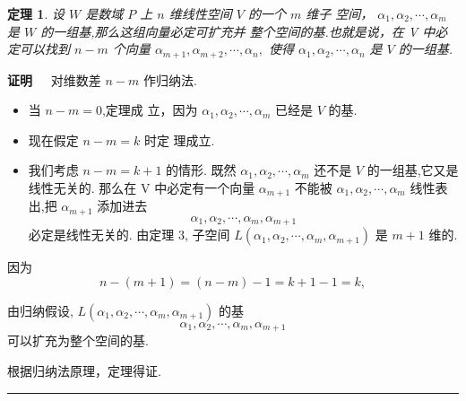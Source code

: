 \documentclass[13pt]{beamer}
\newtheorem{thm}{定理}
\def\qed{\nopagebreak\hfill{\rule{4pt}{7pt}}\medbreak}
\def\pf{{\bf 证明~~ }}
\begin{document}
\begin{frame}
\begin{thm}
设 $W$ 是数域 $P$ 上 $n$ 维线性空间 $V$ 的一个 $m$ 维子 空间， ${\alpha}_{1}, {\alpha}_{2}, \cdots, {\alpha}_{m}$ 是 $W$ 的一组基,那么这组向量必定可扩充并
整个空间的基.也就是说，在 V 中必定可以找到 $n-m$ 个向量 ${\alpha}_{m+1}, {\alpha}_{m+2}, \cdots, {\alpha}_{n},$ 使得 ${\alpha}_{1}, {\alpha}_{2}, \cdots, {\alpha}_{n}$ 是 $V$ 的一组基.
\end{thm}
\pf 对维数差 $n-m$ 作归纳法.
\begin{itemize}
\item 当 $n-m=0$,定理成
立，因为 ${\alpha}_{1}, {\alpha}_{2}, \cdots, {\alpha}_{m}$ 已经是 $V$ 的基.

\item 现在假定 $n-m=k$ 时定
理成立.
\item 我们考虑 $n-m=k+1$ 的情形.
既然 ${\alpha}_{1}, {\alpha}_{2}, \cdots, {\alpha}_{m}$ 还不是 $V$ 的一组基,它又是线性无关的.
那么在 V 中必定有一个向量 ${\alpha}_{m+1}$ 不能被 ${\alpha}_{1}, {\alpha}_{2}, \cdots, {\alpha}_{m}$ 线性表
出,把 ${\alpha}_{m+1}$ 添加进去 $${\alpha}_{1}, {\alpha}_{2}, \cdots, {\alpha}_{m}, {\alpha}_{m+1}$$ 必定是线性无关的.
由定理 3, 子空间 $L\left({\alpha}_{1}, {\alpha}_{2}, \cdots, {\alpha}_{m}, {\alpha}_{m+1}\right)$ 是 $m+1$ 维的.
\end{itemize}
\end{frame}

\begin{frame}


因为 $$n-(m+1)=(n-m)-1=k+1-1=k,$$ 

由\alert{归纳假设}, $ L\left({\alpha}_{1}, {\alpha}_{2}, \cdots, {\alpha}_{m}, {\alpha}_{m+1}\right)$ 的基 $${\alpha}_{1}, {\alpha}_{2}, \cdots, {\alpha}_{m}, {\alpha}_{m+1}$$ 可以扩充为整个空间的基. 

根据归纳法原理，定理得证. \qed
\end{frame}
\end{document}
